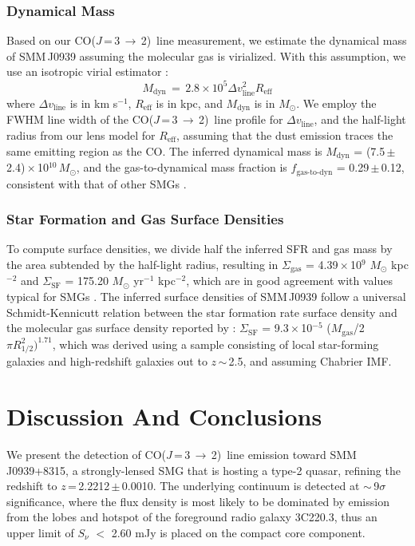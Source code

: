 \documentclass[twocolumn,apj,numberedappendix]{emulateapj}
\newcommand{\Msun}{\mbox{$M_{\odot}$}}
\newcommand{\CO}{\mbox{CO($J$\,=\,3\,$\rightarrow$\,2) }}
\newcommand{\eg}{{\sl e.g.,~}}
\newcommand{\pmOne}{\mbox{$^{-1}$}}
\begin{document}
\subsubsection{Dynamical Mass} 
Based on our \CO line measurement, we estimate the dynamical mass of SMM\,J0939 assuming the molecular gas is virialized. With this assumption, we use an isotropic virial estimator \citep[\eg][]{Engel10a}:
\begin{equation}
M_\textrm{dyn}\,=\,2.8\times 10^5\Delta v_\textrm{line}^ 2 R_\textrm{eff}
\end{equation}
where $\Delta v_\textrm{line}$ is in km\,\,s\pmOne, $R_\textrm{eff}$ is in kpc, and $M_\textrm{dyn}$ is in \Msun.
We employ the FWHM line width of the \CO line profile for $\Delta v_\textrm{line}$,
and the half-light radius from our lens model for $R_\textrm{eff}$, assuming that the dust emission traces the same emitting region as the CO. The inferred dynamical mass is $M_\textrm{dyn}$ = (7.5\,$\pm$\,2.4)\,$\times$\,10$^{10}$\,\Msun, and the gas-to-dynamical mass fraction is $f_\textrm{gas-to-dyn}$ = 0.29\,$\pm$\,0.12, consistent with that of other SMGs \citep{Tacconi06a}.

\subsubsection{Star Formation and Gas Surface Densities}
To compute surface densities, we divide half the inferred SFR and gas mass by the area subtended by the half-light 
radius, resulting in $\Sigma_\textrm{gas}$ = 4.39\,$\times$\,10$^9$\,\,\Msun\,\,kpc$^{-2}$ and $\Sigma_\textrm{SF}$ = 175.20 \Msun\,\,yr\pmOne\,\,kpc$^{-2}$, which are in good agreement with values typical for SMGs \citep{Tacconi08a}. The inferred surface densities of SMM\,J0939 follow a universal Schmidt-Kennicutt relation between the star formation rate
surface density and the molecular gas surface density reported by \citet{B07a}: $\Sigma_\textrm{SF}$ = 9.3\,$\times$\,10$^{-5}$ ($M_\textrm{gas}$/2$\pi R_\textrm{1/2}^2)^{1.71}$, which was derived using a sample consisting of local star-forming galaxies and high-redshift 
galaxies
out to $z$\,$\sim$\,2.5, and assuming Chabrier IMF. 

\section{Discussion And Conclusions} 

We present the detection of \CO line emission toward SMM\,J0939+8315, a strongly-lensed SMG that is hosting a type-2 quasar, refining the redshift  
to $z$\,=\,2.2212\,$\pm$\,0.0010. The underlying continuum is detected at $\sim$\,9$\sigma$ significance, where the flux density is most likely to be 
dominated by emission from the lobes and hotspot of the foreground radio galaxy 3C220.3, thus an upper limit of $S_\nu$ $<$ 2.60 mJy is 
placed on the compact core component. 
\end{document}
